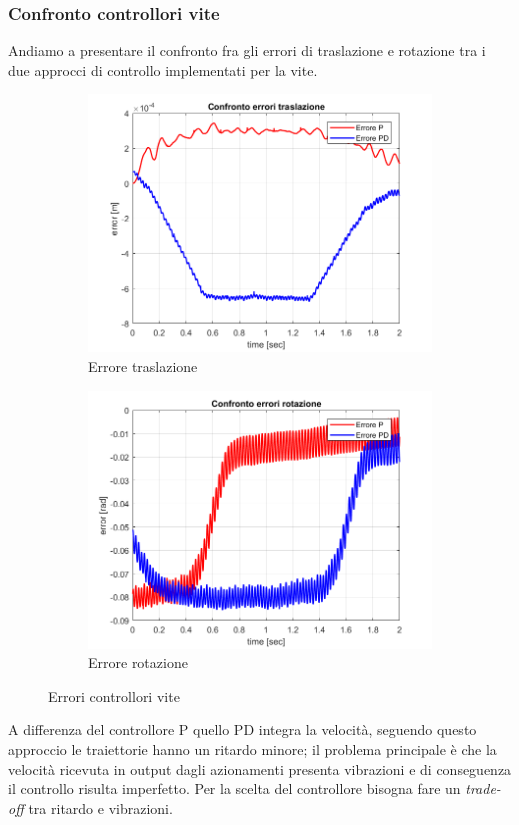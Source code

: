 \subsubsection{Confronto controllori vite}	
Andiamo a presentare il confronto fra gli errori di traslazione e rotazione tra i due approcci di controllo implementati per la vite.
\begin{figure}
	\centering
	\begin{subfigure}{.45\textwidth}
		\centering
		\includegraphics[width=.8\linewidth]{Immagini/Traiettorie/errTras}  
		\caption{Errore traslazione}
		\label{fig:sub-errT}
	\end{subfigure}
	\begin{subfigure}{.45\textwidth}
		\centering
		\includegraphics[width=.8\linewidth]{Immagini/Traiettorie/errRot}  
		\caption{Errore rotazione}
		\label{fig:sub-errR}
	\end{subfigure}
	\caption{Errori controllori vite}
	\label{fig:errVite}
\end{figure}
A differenza del controllore P quello PD integra la velocità, seguendo questo approccio le traiettorie hanno un ritardo minore; il problema principale è che la velocità ricevuta in output dagli azionamenti presenta vibrazioni e di conseguenza il controllo risulta imperfetto. Per la scelta del controllore bisogna fare un \textit{trade-off} tra ritardo e vibrazioni.
